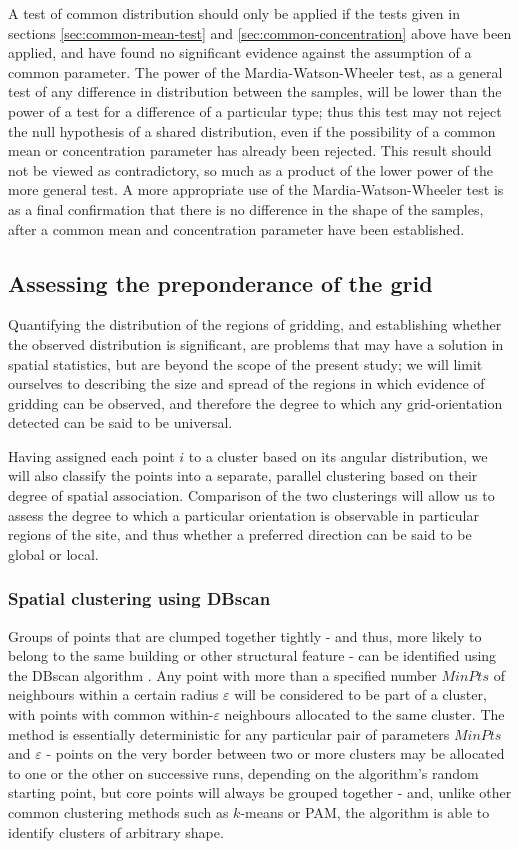 \documentclass[../../ArchStats.tex]{subfiles}
\begin{document}
A test of common distribution should only be applied if the tests given in sections \ref{sec:common-mean-test} and \ref{sec:common-concentration} above have been applied, and have found no significant evidence against the assumption of a common parameter. The power of the Mardia-Watson-Wheeler test, as a general test of any difference in distribution between the samples, will be lower than the power of a test for a difference of a particular type; thus this test may not reject the null hypothesis of a shared distribution, even if the possibility of a common mean or concentration parameter has already been rejected. This result should not be viewed as contradictory, so much as a product of the lower power of the more general test. A more appropriate use of the Mardia-Watson-Wheeler test is as a final confirmation that there is no difference in the shape of the samples, after a common mean and concentration parameter have been established.


\subsection{Assessing the preponderance of the grid}

Quantifying the distribution of the regions of gridding, and establishing whether the observed distribution is significant, are problems that may have a solution in spatial statistics, but are beyond the scope of the present study; we will limit ourselves to describing the size and spread of the regions in which evidence of gridding can be observed, and therefore the degree to which any grid-orientation detected can be said to be universal. 

Having assigned each point $i$ to a cluster based on its angular distribution, we will also classify the points into a separate, parallel clustering based on their degree of spatial association. Comparison of the two clusterings will allow us to assess the degree to which a particular orientation is observable in particular regions of the site, and thus whether a preferred direction can be said to be global or local.

\subsubsection{Spatial clustering using DBscan}
\label{sec:DBscan}
Groups of points that are clumped together tightly - and thus, more likely to belong to the same building or other structural feature - can be identified using the DBscan algorithm \cite{Ester1996}. Any point with more than a specified number $MinPts$ of neighbours within a certain radius $\varepsilon$ will be considered to be part of a cluster, with points with common within-$\varepsilon$ neighbours allocated to the same cluster. The method is essentially deterministic for any particular pair of parameters $MinPts$ and $\varepsilon$ - points on the very border between two or more clusters may be allocated to one or the other on successive runs, depending on the algorithm's random starting point, but core points will always be grouped together - and, unlike other common clustering methods such as $k$-means or PAM, the algorithm is able to identify clusters of arbitrary shape. 
\end{document}
